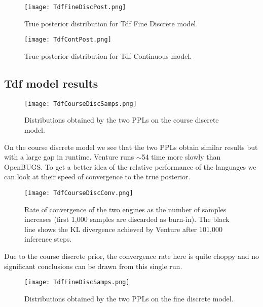 \begin{figure}[H]
    \centering
    \texttt{[image: TdfFineDiscPost.png]}
    \caption{True posterior distribution for Tdf Fine Discrete model.}
    \label{fig:tdfCourseDiscSamp}
\end{figure}

\begin{figure}[H]
    \centering
    \texttt{[image: TdfContPost.png]}
    \caption{True posterior distribution for Tdf Continuous model.}
    \label{fig:tdfCourseDiscSamp}
\end{figure}

\subsection{Tdf model results}
\begin{figure}[H]
    \centering
    \texttt{[image: TdfCourseDiscSamps.png]}
    \caption{Distributions obtained by the two PPLs on the course discrete model.}
    \label{fig:tdfCourseDiscSamp}
\end{figure}

On the course discrete model we see that the two PPLs obtain similar results but with a large gap in runtime. Venture runs $\sim$54 time more slowly than OpenBUGS. To get a better idea of the relative performance of the languages we can look at their speed of convergence to the true posterior.

\begin{figure}[H]
    \centering
    \texttt{[image: TdfCourseDiscConv.png]}
    \caption{Rate of convergence of the two engines as the number of samples increases (first 1,000 samples are discarded as burn-in). The black line shows the KL divergence achieved by Venture after 101,000 inference steps.}
    \label{fig:tdfCourseDiscConv}
\end{figure}

Due to the course discrete prior, the convergence rate here is quite choppy and no significant conclusions can be drawn from this single run. 

\begin{figure}[H]
    \centering
    \texttt{[image: TdfFineDiscSamps.png]}
    \caption{Distributions obtained by the two PPLs on the fine discrete model.}
    \label{fig:tdfFineDiscSamp}
\end{figure}

